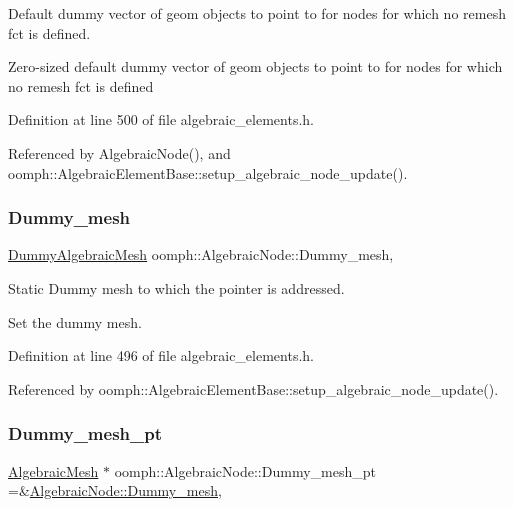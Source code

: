 Default dummy vector of geom objects to point to for nodes for which no remesh fct is defined. 

Zero-\/sized default dummy vector of geom objects to point to for nodes for which no remesh fct is defined 

Definition at line 500 of file algebraic\+\_\+elements.\+h.



Referenced by Algebraic\+Node(), and oomph\+::\+Algebraic\+Element\+Base\+::setup\+\_\+algebraic\+\_\+node\+\_\+update().

\mbox{\label{classoomph_1_1AlgebraicNode_aa89c19c1d7c5e5efd1b501098491bf5c}} 
\subsubsection{\texorpdfstring{Dummy\+\_\+mesh}{Dummy\_mesh}}
{\footnotesize\ttfamily \hyperlink{classoomph_1_1DummyAlgebraicMesh}{Dummy\+Algebraic\+Mesh} oomph\+::\+Algebraic\+Node\+::\+Dummy\+\_\+mesh\hspace{0.3cm}{\ttfamily [static]}, {\ttfamily [private]}}



Static Dummy mesh to which the pointer is addressed. 

Set the dummy mesh. 

Definition at line 496 of file algebraic\+\_\+elements.\+h.



Referenced by oomph\+::\+Algebraic\+Element\+Base\+::setup\+\_\+algebraic\+\_\+node\+\_\+update().

\mbox{\label{classoomph_1_1AlgebraicNode_a21f78f61150e308456db352907aa26c6}} 
\subsubsection{\texorpdfstring{Dummy\+\_\+mesh\+\_\+pt}{Dummy\_mesh\_pt}}
{\footnotesize\ttfamily \hyperlink{classoomph_1_1AlgebraicMesh}{Algebraic\+Mesh} $\ast$ oomph\+::\+Algebraic\+Node\+::\+Dummy\+\_\+mesh\+\_\+pt =\&\hyperlink{classoomph_1_1AlgebraicNode_aa89c19c1d7c5e5efd1b501098491bf5c}{Algebraic\+Node\+::\+Dummy\+\_\+mesh}\hspace{0.3cm}{\ttfamily [static]}, {\ttfamily [private]}}



